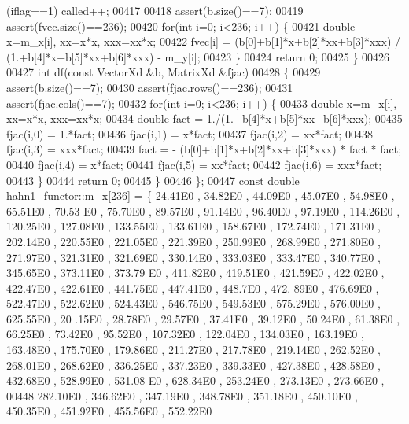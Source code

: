 \begin{DoxyCode}
{       (iflag==1) called++;}
00417 
00418         assert(b.size()==7);
00419         assert(fvec.size()==236);
00420         \textcolor{keywordflow}{for}(\textcolor{keywordtype}{int} i=0; i<236; i++) \{
00421             \textcolor{keywordtype}{double} x=m\_x[i], xx=x*x, xxx=xx*x;
00422             fvec[i] = (b[0]+b[1]*x+b[2]*xx+b[3]*xxx) / (1.+b[4]*x+b[5]*xx+b[6]*xxx) - m\_y[i];
00423         \}
00424         \textcolor{keywordflow}{return} 0;
00425     \}
00426 
00427     \textcolor{keywordtype}{int} df(\textcolor{keyword}{const} VectorXd &b, MatrixXd &fjac)
00428     \{
00429         assert(b.size()==7);
00430         assert(fjac.rows()==236);
00431         assert(fjac.cols()==7);
00432         \textcolor{keywordflow}{for}(\textcolor{keywordtype}{int} i=0; i<236; i++) \{
00433             \textcolor{keywordtype}{double} x=m\_x[i], xx=x*x, xxx=xx*x;
00434             \textcolor{keywordtype}{double} fact = 1./(1.+b[4]*x+b[5]*xx+b[6]*xxx);
00435             fjac(i,0) = 1.*fact;
00436             fjac(i,1) = x*fact;
00437             fjac(i,2) = xx*fact;
00438             fjac(i,3) = xxx*fact;
00439             fact = - (b[0]+b[1]*x+b[2]*xx+b[3]*xxx) * fact * fact;
00440             fjac(i,4) = x*fact;
00441             fjac(i,5) = xx*fact;
00442             fjac(i,6) = xxx*fact;
00443         \}
00444         \textcolor{keywordflow}{return} 0;
00445     \}
00446 \};
00447 \textcolor{keyword}{const} \textcolor{keywordtype}{double} hahn1\_functor::m\_x[236] = \{ 24.41E0 , 34.82E0 , 44.09E0 , 45.07E0 , 54.98E0 , 65.51E0 , 70.53
      E0 , 75.70E0 , 89.57E0 , 91.14E0 , 96.40E0 , 97.19E0 , 114.26E0 , 120.25E0 , 127.08E0 , 133.55E0 , 133.61E0 ,
       158.67E0 , 172.74E0 , 171.31E0 , 202.14E0 , 220.55E0 , 221.05E0 , 221.39E0 , 250.99E0 , 268.99E0 , 271.80E0
       , 271.97E0 , 321.31E0 , 321.69E0 , 330.14E0 , 333.03E0 , 333.47E0 , 340.77E0 , 345.65E0 , 373.11E0 , 373.79
      E0 , 411.82E0 , 419.51E0 , 421.59E0 , 422.02E0 , 422.47E0 , 422.61E0 , 441.75E0 , 447.41E0 , 448.7E0  , 472.
      89E0 , 476.69E0 , 522.47E0 , 522.62E0 , 524.43E0 , 546.75E0 , 549.53E0 , 575.29E0 , 576.00E0 , 625.55E0 , 20
      .15E0 , 28.78E0 , 29.57E0 , 37.41E0 , 39.12E0 , 50.24E0 , 61.38E0 , 66.25E0 , 73.42E0 , 95.52E0 , 107.32E0 ,
       122.04E0 , 134.03E0 , 163.19E0 , 163.48E0 , 175.70E0 , 179.86E0 , 211.27E0 , 217.78E0 , 219.14E0 , 262.52E0
       , 268.01E0 , 268.62E0 , 336.25E0 , 337.23E0 , 339.33E0 , 427.38E0 , 428.58E0 , 432.68E0 , 528.99E0 , 531.08
      E0 , 628.34E0 , 253.24E0 , 273.13E0 , 273.66E0 ,
00448 282.10E0 , 346.62E0 , 347.19E0 , 348.78E0 , 351.18E0 , 450.10E0 , 450.35E0 , 451.92E0 , 455.56E0 , 552.22E0

\end{DoxyCode}

